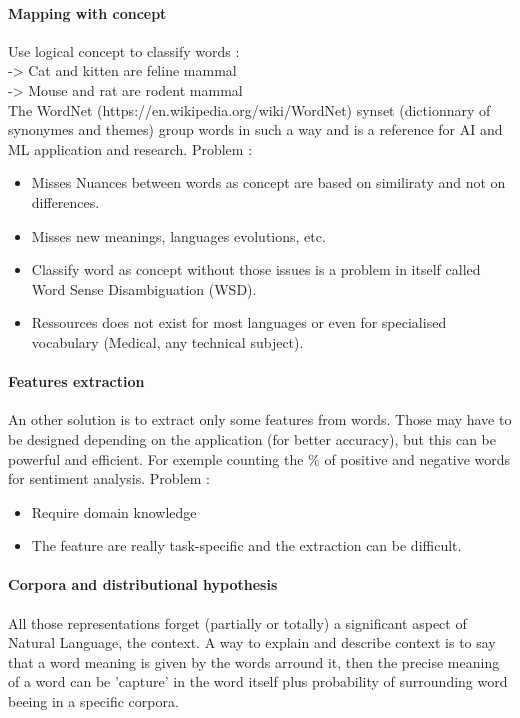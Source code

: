 		\paragraph{Mapping with concept}
			Use logical concept to classify words : \\
			-> Cat and kitten are feline mammal \\
			-> Mouse and rat are rodent mammal\\
			The WordNet (https://en.wikipedia.org/wiki/WordNet) synset (dictionnary of synonymes and themes) group words in such a way and is a reference for AI and ML application and research.
			Problem :
			\begin{itemize}
				\item Misses Nuances between words as concept are based on similiraty and not on differences.
				\item Misses new meanings, languages evolutions, etc. 
				\item Classify word as concept without those issues is a problem in itself called Word Sense Disambiguation (WSD).
				\item Ressources does not exist for most languages or even for specialised vocabulary (Medical, any technical subject).
			\end{itemize}


		\paragraph{Features extraction}
			An other solution is to extract only some features from words. Those may have to be designed depending on the application (for better accuracy), but this can be powerful and efficient. For exemple counting the \% of positive and negative words for sentiment analysis. 
			Problem : 
			\begin{itemize}
				\item Require domain knowledge
				\item The feature are really task-specific and the extraction can be difficult.
			\end{itemize}

		\paragraph{Corpora and distributional hypothesis}
			All those representations forget (partially or totally) a significant aspect of Natural Language, the context. A way to explain and describe context is to say that a word meaning is given by the words arround it, then the precise meaning of a word can be 'capture' in the word itself plus probability of surrounding word beeing in a specific corpora. \\

